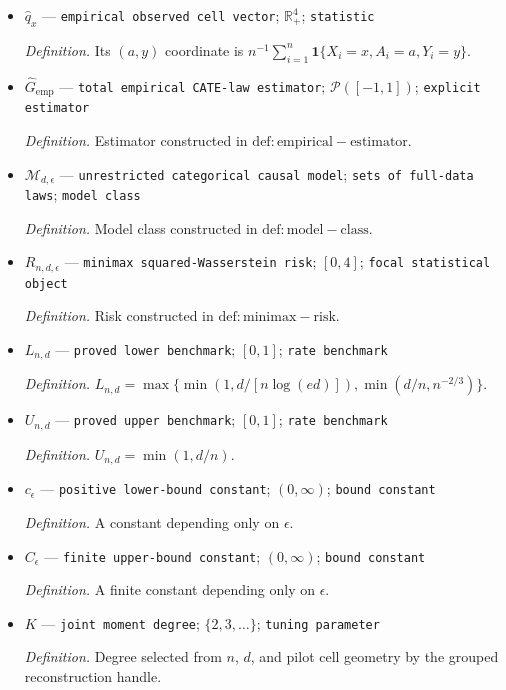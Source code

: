 \documentclass{article}
\begin{document}
\begin{itemize}
  \item \(\widehat q_x\) --- \texttt{empirical observed cell vector}; \(\mathbb R_+^4\); \texttt{statistic}
  \par\smallskip\noindent\emph{Definition.} Its \((a,y)\) coordinate is \(n^{-1}\sum_{i=1}^n\mathbf 1\{X_i=x,A_i=a,Y_i=y\}\).
  \item \(\widehat G_{\mathrm{emp}}\) --- \texttt{total empirical CATE-\allowbreak{}law estimator}; \(\mathcal P([-1,1])\); \texttt{explicit estimator}
  \par\smallskip\noindent\emph{Definition.} Estimator constructed in \(\mathrm{def:empirical-estimator}\).
  \item \(\mathcal M_{d,\epsilon}\) --- \texttt{unrestricted categorical causal model}; \texttt{sets of full-\allowbreak{}data laws}; \texttt{model class}
  \par\smallskip\noindent\emph{Definition.} Model class constructed in \(\mathrm{def:model-class}\).
  \item \(R_{n,d,\epsilon}\) --- \texttt{minimax squared-\allowbreak{}Wasserstein risk}; \([0,4]\); \texttt{focal statistical object}
  \par\smallskip\noindent\emph{Definition.} Risk constructed in \(\mathrm{def:minimax-risk}\).
  \item \(L_{n,d}\) --- \texttt{proved lower benchmark}; \([0,1]\); \texttt{rate benchmark}
  \par\smallskip\noindent\emph{Definition.} \(L_{n,d}=\max\{\min(1,d/[n\log(ed)]),\min(d/n,n^{-2/3})\}\).
  \item \(U_{n,d}\) --- \texttt{proved upper benchmark}; \([0,1]\); \texttt{rate benchmark}
  \par\smallskip\noindent\emph{Definition.} \(U_{n,d}=\min(1,d/n)\).
  \item \(c_\epsilon\) --- \texttt{positive lower-\allowbreak{}bound constant}; \((0,\infty)\); \texttt{bound constant}
  \par\smallskip\noindent\emph{Definition.} A constant depending only on \(\epsilon\).
  \item \(C_\epsilon\) --- \texttt{finite upper-\allowbreak{}bound constant}; \((0,\infty)\); \texttt{bound constant}
  \par\smallskip\noindent\emph{Definition.} A finite constant depending only on \(\epsilon\).
  \item \(K\) --- \texttt{joint moment degree}; \(\{2,3,\ldots\}\); \texttt{tuning parameter}
  \par\smallskip\noindent\emph{Definition.} Degree selected from \(n\), \(d\), and pilot cell geometry by the grouped reconstruction handle.

\end{itemize}
\end{document}
